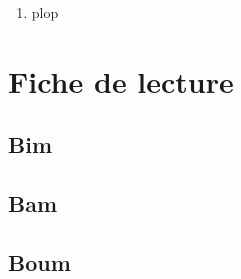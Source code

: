 \documentclass[11pt]{article}
\begin{document}
\begin{enumerate}
 
 \item plop
 
\end{enumerate}

\section{Fiche de lecture}

\subsection{Bim}


\subsection{Bam}

\subsection{Boum}
\end{document}
